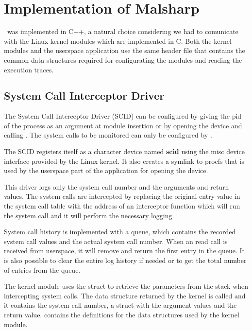 \chapter{Implementation of Malsharp}
\label{chapter:fourth}

\project\ was implemented in C++, a natural choice considering we had to comunicate with the Linux kernel modules which are implemented in C. Both the kernel modules and the userspace application use the same header file that contains the common data structures required for configurating the modules and reading the execution traces.

\section{System Call Interceptor Driver}
\label{fourth:scid}

The System Call Interceptor Driver (SCID) can be configured by giving the pid of the process as an argument at module insertion or by opening the device and calling . The system calls to be monitored can only be configured by .

The SCID registers itself as a character device named \textbf{scid} using the misc device interface provided by the Linux kernel. It also creates a symlink to procfs that is used by the userspace part of the application for opening the device.

This driver logs only the system call number and the arguments and return values. The system calls are intercepted by replacing the original entry value in the system call table with the address of an interceptor function which will run the system call and it will perform the necessary logging.

System call history is implemented with a queue, which contains the recorded system call values and the actual system call number. When an  read call is received from userspace, it will remove and return the first entry in the queue. It is also possible to clear the entire log history if needed or to get the total number of entries from the queue.

The kernel module uses the  struct to retrieve the parameters from the stack when intercepting system calls. The data structure returned by the kernel is called  and it contains the system call number, a  struct with the argument values and the return value.  contains the definitions for the data structures used by the kernel module.

